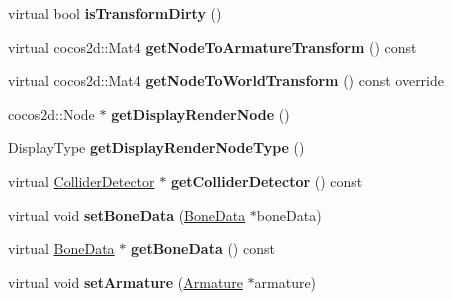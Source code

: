 \begin{DoxyCompactItemize}
\mbox{\label{classcocostudio_1_1Bone_a14fe8e71a1d9145d93fd7b246f34c71d}} 
virtual bool {\bfseries is\+Transform\+Dirty} ()
\item 
\mbox{\label{classcocostudio_1_1Bone_a07c270a9cc898b1569a18de646906e02}} 
virtual cocos2d\+::\+Mat4 {\bfseries get\+Node\+To\+Armature\+Transform} () const
\item 
\mbox{\label{classcocostudio_1_1Bone_a7bfe114dea80b86c2afedf665b0faf05}} 
virtual cocos2d\+::\+Mat4 {\bfseries get\+Node\+To\+World\+Transform} () const override
\item 
\mbox{\label{classcocostudio_1_1Bone_a752aa052382214d62f80f25ad7331a6f}} 
cocos2d\+::\+Node $\ast$ {\bfseries get\+Display\+Render\+Node} ()
\item 
\mbox{\label{classcocostudio_1_1Bone_a18dc647785590600cf5fb77ec19cc7a9}} 
Display\+Type {\bfseries get\+Display\+Render\+Node\+Type} ()
\item 
\mbox{\label{classcocostudio_1_1Bone_ab21662edbc7084e8ab7a59796277d832}} 
virtual \hyperlink{classcocostudio_1_1ColliderDetector}{Collider\+Detector} $\ast$ {\bfseries get\+Collider\+Detector} () const
\item 
\mbox{\label{classcocostudio_1_1Bone_ae856bf301564cb35cd96090c53b08b0f}} 
virtual void {\bfseries set\+Bone\+Data} (\hyperlink{classcocostudio_1_1BoneData}{Bone\+Data} $\ast$bone\+Data)
\item 
\mbox{\label{classcocostudio_1_1Bone_a9c35fba63576a43016a5e70230a00b3e}} 
virtual \hyperlink{classcocostudio_1_1BoneData}{Bone\+Data} $\ast$ {\bfseries get\+Bone\+Data} () const
\item 
\mbox{\label{classcocostudio_1_1Bone_a61a39bf9b7a48166cb5455a5d4570d88}} 
virtual void {\bfseries set\+Armature} (\hyperlink{classcocostudio_1_1Armature}{Armature} $\ast$armature)
\item 
\mbox{\label{classcocostudio_1_1Bone_a52c88911876abf7bd6e89afb3e048f46}} 

\end{DoxyCompactItemize}
